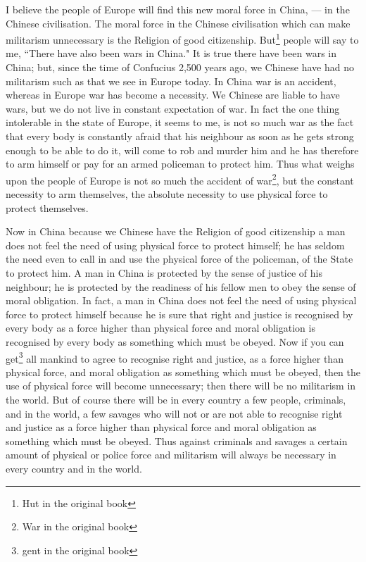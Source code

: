 I believe the people of Europe will find this new moral force in China, --- in the Chinese civilisation.
The moral force in the Chinese civilisation which can make militarism unnecessary is the Religion of good citizenship.
But\footnote{Hut in the original book} people will say to me, ``There have also been wars in China."
It is true there have been wars in China; but, since the time of Confucius 2,500 years ago, we Chinese have had no militarism such as that we see in Europe today.
In China war is an accident, whereas in Europe war has become a necessity.
We Chinese are liable to have wars, but we do not live in constant expectation of war.
In fact the one thing intolerable in the state of Europe, it seems to me, is not so much war as the fact that every body is constantly afraid that his neighbour as soon as he gets strong enough to be able to do it, will come to rob and murder him and he has therefore to arm himself or pay for an armed policeman to protect him.
Thus what weighs upon the people of Europe is not so much the accident of war\footnote{War in the original book}, but the constant necessity to arm themselves, the absolute necessity to use physical force to protect themselves.

Now in China because we Chinese have the Religion of good citizenship a man does not feel the need of using physical force to protect himself; he has seldom the need even to call in and use the physical force of the policeman, of the State to protect him.
A man in China is protected by the sense of justice of his neighbour; he is protected by the readiness of his fellow men to obey the sense of moral obligation.
In fact, a man in China does not feel the need of using physical force to protect himself because he is sure that right and justice is recognised by every body as a force higher than physical force and moral obligation is recognised by every body as something which must be obeyed.
Now if you can get\footnote{gent in the original book} all mankind to agree to recognise right and justice, as a force higher than physical force, and moral obligation as something which must be obeyed, then the use of physical force will become unnecessary; then there will be no militarism in the world.
But of course there will be in every country a few people, criminals, and in the world, a few savages who will not or are not able to recognise right and justice as a force higher than physical force and moral obligation as something which must be obeyed.
Thus against criminals and savages a certain amount of physical or police force and militarism will always be necessary in every country and in the world.

